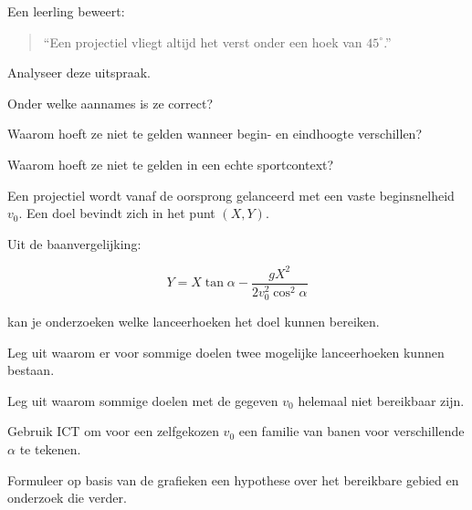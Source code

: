 \documentclass{ximera}
\begin{document}
\begin{oefening}{\oefG}

Een leerling beweert:

\begin{quote}
``Een projectiel vliegt altijd het verst onder een hoek van
$45^\circ$.''
\end{quote}

Analyseer deze uitspraak.

\begin{question}
Onder welke aannames is ze correct?
\end{question}

\begin{question}
Waarom hoeft ze niet te gelden wanneer begin- en eindhoogte
verschillen?
\end{question}

\begin{question}
Waarom hoeft ze niet te gelden in een echte sportcontext?
\end{question}

\end{oefening}




\begin{oefening}{\oefG}

Een projectiel wordt vanaf de oorsprong gelanceerd met een vaste
beginsnelheid $v_0$. Een doel bevindt zich in het punt $(X,Y)$.

Uit de baanvergelijking:

\[
Y
=
X\tan\alpha
-
\frac{gX^2}{2v_0^2\cos^2\alpha}
\]

kan je onderzoeken welke lanceerhoeken het doel kunnen bereiken.

\begin{question}
Leg uit waarom er voor sommige doelen twee mogelijke lanceerhoeken
kunnen bestaan.
\end{question}

\begin{question}
Leg uit waarom sommige doelen met de gegeven $v_0$ helemaal niet
bereikbaar zijn.
\end{question}

\begin{question}
Gebruik ICT om voor een zelfgekozen $v_0$ een familie van banen voor
verschillende $\alpha$ te tekenen.
\end{question}

\begin{question}
Formuleer op basis van de grafieken een hypothese over het bereikbare
gebied en onderzoek die verder.
\end{question}

\end{oefening}
\end{document}
